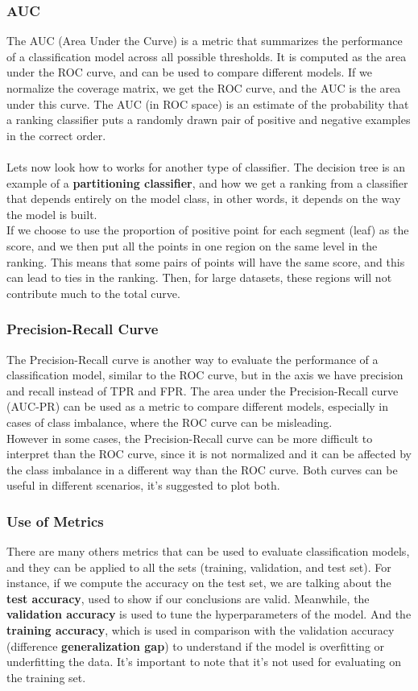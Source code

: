 \subsubsection{AUC}
The AUC (Area Under the Curve) is a metric that summarizes the performance of a classification model across all possible thresholds.
It is computed as the area under the ROC curve, and can be used to compare different models.
If we normalize the coverage matrix, we get the ROC curve, and the AUC is the area under this curve.
The AUC (in ROC space) is an estimate of the probability that a ranking classifier puts a randomly drawn pair of positive and negative examples in the correct order.
\\\\
Lets now look how to works for another type of classifier.
The decision tree is an example of a \textbf{partitioning classifier}, and how we get a ranking from a classifier that depends entirely on the model class, in other words, it depends on the way the model is built.
\\
If we choose to use the proportion of positive point for each segment (leaf) as the score, and we then put all the points in one region on the same level in the ranking.
This means that some pairs of points will have the same score, and this can lead to ties in the ranking.
Then, for large datasets, these regions will not contribute much to the total curve.

\subsubsection{Precision-Recall Curve}
The Precision-Recall curve is another way to evaluate the performance of a classification model, similar to the ROC curve, but in the axis we have precision and recall instead of TPR and FPR.
The area under the Precision-Recall curve (AUC-PR) can be used as a metric to compare different models, especially in cases of class imbalance, where the ROC curve can be misleading.
\\
However in some cases, the Precision-Recall curve can be more difficult to interpret than the ROC curve, since it is not normalized and it can be affected by the class imbalance in a different way than the ROC curve.
Both curves can be useful in different scenarios, it's suggested to plot both.

\subsubsection{Use of Metrics}
There are many others metrics that can be used to evaluate classification models, and they can be applied to all the sets (training, validation, and test set).
For instance, if we compute the accuracy on the test set, we are talking about the \textbf{test accuracy}, used to show if our conclusions are valid.
Meanwhile, the \textbf{validation accuracy} is used to tune the hyperparameters of the model.
And the \textbf{training accuracy}, which is used in comparison with the validation accuracy (difference \textbf{generalization gap}) to understand if the model is overfitting or underfitting the data.
It's important to note that it's not used for evaluating on the training set.

